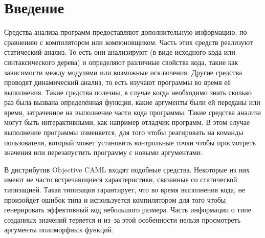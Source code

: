 \section {Введение}
\label{sec:intro_10}

Средства анализа программ предоставляют дополнительную информацию, по сравнению
с компилятором или компоновщиком. Часть этих средств реализуют статический
анализ. То есть они анализируют (в виде исходного кода или синтаксического
дерева) и определяют различные свойства кода, такие как зависимости между
модулями или возможные исключения. Другие средства проводят динамический анализ,
то есть изучают программы во время её выполнения. Такие средства полезны, в
случае когда необходимо знать сколько раз была вызвана определённая функция,
какие аргументы были ей переданы или время, затраченное на выполнение части кода
программы. Такие средства анализа могут быть интерактивными, как например
отладчик программ. В этом случае выполнение программы изменяется, для того чтобы
реагировать на команды пользователя, который может установить контрольные точки
чтобы просмотреть значения или перезапустить программу с новыми аргументами.

В дистрибутив Objective CAML входят подобные средства. Некоторые из них имеют не
часто встречающиеся характеристики, связанные со статической типизацией. Такая
типизация гарантирует, что во время выполнения кода, не произойдёт ошибок типа и
используется компилятором для того чтобы генерировать эффективный код небольшого
размера. Часть информации о типе созданных значений теряется и из--за этой
особенности нельзя просмотреть аргументы полиморфных функций.
